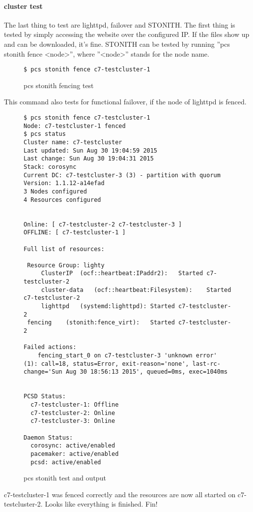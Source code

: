 \paragraph{cluster test}
The last thing to test are lighttpd, failover and \ac{STONITH}.
The first thing is tested by simply accessing the website over the configured IP.
If the files show up and can be downloaded, it's fine.
\ac{STONITH} can be tested by running ''pcs stonith fence <node>'', where
''<node>'' stands for the node name.
\begin{figure}
\begin{lstlisting}
$ pcs stonith fence c7-testcluster-1
\end{lstlisting}
\caption{pcs stonith fencing test}
\end{figure}
This command also tests for functional failover, if the node of lighttpd is fenced.
\begin{figure}
\begin{lstlisting}
$ pcs stonith fence c7-testcluster-1
Node: c7-testcluster-1 fenced
$ pcs status
Cluster name: c7-testcluster
Last updated: Sun Aug 30 19:04:59 2015
Last change: Sun Aug 30 19:04:31 2015
Stack: corosync
Current DC: c7-testcluster-3 (3) - partition with quorum
Version: 1.1.12-a14efad
3 Nodes configured
4 Resources configured


Online: [ c7-testcluster-2 c7-testcluster-3 ]
OFFLINE: [ c7-testcluster-1 ]

Full list of resources:

 Resource Group: lighty
     ClusterIP	(ocf::heartbeat:IPaddr2):	Started c7-testcluster-2 
     cluster-data	(ocf::heartbeat:Filesystem):	Started c7-testcluster-2 
     lighttpd	(systemd:lighttpd):	Started c7-testcluster-2 
 fencing	(stonith:fence_virt):	Started c7-testcluster-2 

Failed actions:
    fencing_start_0 on c7-testcluster-3 'unknown error' (1): call=18, status=Error, exit-reason='none', last-rc-change='Sun Aug 30 18:56:13 2015', queued=0ms, exec=1040ms


PCSD Status:
  c7-testcluster-1: Offline
  c7-testcluster-2: Online
  c7-testcluster-3: Online

Daemon Status:
  corosync: active/enabled
  pacemaker: active/enabled
  pcsd: active/enabled
\end{lstlisting}
\caption{pcs stonith test and output}
\end{figure}
c7-testcluster-1 was fenced correctly and the resources are now all started on c7-testcluster-2.
Looks like everything is finished. Fin!

